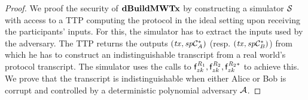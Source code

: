 \begin{proof}
    \label{prf:atom:sec-dbuildmw}
    We proof the security of $\mathbf{dBuildMWTx}$ by constructing a simulator $\mathcal{S}$ with access to a TTP computing the protocol in the ideal setting upon receiving the participants' inputs.
    For this, the simulator has to extract the inputs used by the adversary.
    The TTP returns the outputs $(\mathit{tx}, \mathit{sp}\mathcal{C}_{\mathit{A}}^*)$ (resp. $(\mathit{tx}, \mathit{sp}\mathcal{C}_{\mathit{B}}^*)$) from which he has to construct an indistinguishable transcript from a real world's protocol transcript.
    The simulator uses the calls to $\mathsf{f}^{\mathit{R}_1}_{zk}, \mathsf{f}^{\mathit{R}_2}_{zk}, \mathsf{f}^{\mathit{R}_2*}_{zk}$ to achieve this.
    We prove that the transcript is indistinguishable when either Alice or Bob is corrupt and controlled by a deterministic polynomial adversary $\mathcal{A}$.


\end{proof}
